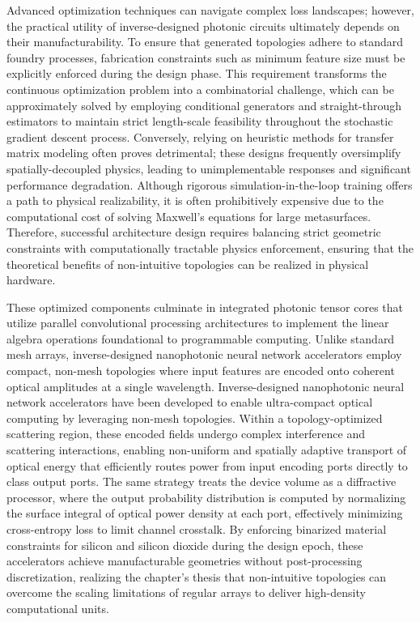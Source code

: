 Advanced optimization techniques can navigate complex loss landscapes; however, the practical utility of inverse-designed photonic circuits ultimately depends on their manufacturability. To ensure that generated topologies adhere to standard foundry processes, fabrication constraints such as minimum feature size must be explicitly enforced during the design phase. This requirement transforms the continuous optimization problem into a combinatorial challenge, which can be approximately solved by employing conditional generators and straight-through estimators to maintain strict length-scale feasibility throughout the stochastic gradient descent process. \citep{doi_10_1021_acsphotonics_2c00313_0d7d39c3} Conversely, relying on heuristic methods for transfer matrix modeling often proves detrimental; these designs frequently oversimplify spatially-decoupled physics, leading to unimplementable responses and significant performance degradation. Although rigorous simulation-in-the-loop training offers a path to physical realizability, it is often prohibitively expensive due to the computational cost of solving Maxwell's equations for large metasurfaces. Therefore, successful architecture design requires balancing strict geometric constraints with computationally tractable physics enforcement, ensuring that the theoretical benefits of non-intuitive topologies can be realized in physical hardware. \citep{doi_10_1021_acsphotonics_2c00313_0d7d39c3} \citep{doi_10_48550_arxiv_2505_18377_a6fc9ec3}

These optimized components culminate in integrated photonic tensor cores that utilize parallel convolutional processing architectures to implement the linear algebra operations foundational to programmable computing. Unlike standard mesh arrays, inverse-designed nanophotonic neural network accelerators employ compact, non-mesh topologies where input features are encoded onto coherent optical amplitudes at a single wavelength. Inverse-designed nanophotonic neural network accelerators have been developed to enable ultra-compact optical computing by leveraging non-mesh topologies. \citep{doi_10_1038_s41467_026_68648_1_26658a9c} Within a topology-optimized scattering region, these encoded fields undergo complex interference and scattering interactions, enabling non-uniform and spatially adaptive transport of optical energy that efficiently routes power from input encoding ports directly to class output ports. The same strategy treats the device volume as a diffractive processor, where the output probability distribution is computed by normalizing the surface integral of optical power density at each port, effectively minimizing cross-entropy loss to limit channel crosstalk. By enforcing binarized material constraints for silicon and silicon dioxide during the design epoch, these accelerators achieve manufacturable geometries without post-processing discretization, realizing the chapter's thesis that non-intuitive topologies can overcome the scaling limitations of regular arrays to deliver high-density computational units. \citep{doi_10_1515_nanoph_2022_0423_38a2c3ec} \citep{doi_10_1038_s41467_026_68648_1_26658a9c}

